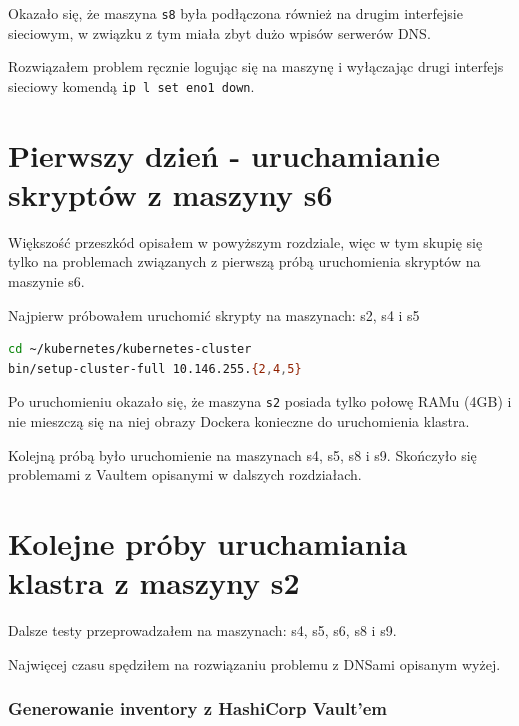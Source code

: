 \documentclass[a4paper,12pt,twoside,openany]{report}
\newcommand{\passthrough}[1]{#1}
\begin{document}
Okazało się, że maszyna \passthrough{\lstinline!s8!} była podłączona
również na drugim interfejsie sieciowym, w związku z tym miała zbyt dużo
wpisów serwerów DNS.

Rozwiązałem problem ręcznie logując się na maszynę i wyłączając drugi
interfejs sieciowy komendą \passthrough{\lstinline!ip l set eno1 down!}.

\hypertarget{pierwszy-dzieux144---uruchamianie-skryptuxf3w-z-maszyny-s6}{%
\section{Pierwszy dzień - uruchamianie skryptów z maszyny
s6}\label{pierwszy-dzieux144---uruchamianie-skryptuxf3w-z-maszyny-s6}}

Większość przeszkód opisałem w powyższym rozdziale, więc w tym skupię
się tylko na problemach związanych z pierwszą próbą uruchomienia
skryptów na maszynie s6.

Najpierw próbowałem uruchomić skrypty na maszynach: s2, s4 i s5

\begin{lstlisting}[language=bash]
cd ~/kubernetes/kubernetes-cluster
bin/setup-cluster-full 10.146.255.{2,4,5}
\end{lstlisting}

Po uruchomieniu okazało się, że maszyna \passthrough{\lstinline!s2!}
posiada tylko połowę RAMu (4GB) i nie mieszczą się na niej obrazy
Dockera konieczne do uruchomienia klastra.

Kolejną próbą było uruchomienie na maszynach s4, s5, s8 i s9. Skończyło
się problemami z Vaultem opisanymi w dalszych rozdziałach.

\hypertarget{kolejne-pruxf3by-uruchamiania-klastra-z-maszyny-s2}{%
\section{Kolejne próby uruchamiania klastra z maszyny
s2}\label{kolejne-pruxf3by-uruchamiania-klastra-z-maszyny-s2}}

Dalsze testy przeprowadzałem na maszynach: s4, s5, s6, s8 i s9.

Najwięcej czasu spędziłem na rozwiązaniu problemu z DNSami opisanym
wyżej.

\hypertarget{generowanie-inventory-z-hashicorp-vaultem}{%
\subsubsection{Generowanie inventory z HashiCorp
Vault'em}\label{generowanie-inventory-z-hashicorp-vaultem}}
\end{document}
